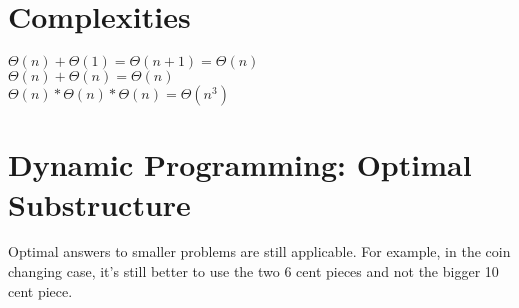 \documentclass{article}
\begin{document}
\section{Complexities}
\label{sec:orgf8be4fb}
\(\Theta(n) + \Theta(1) = \Theta(n+1) = \Theta(n)\) \\
\(\Theta(n) + \Theta(n) = \Theta(n)\) \\
\(\Theta(n) * \Theta(n) * \Theta(n) = \Theta(n^3)\) \\

\section{Dynamic Programming: Optimal Substructure}
\label{sec:orgf0eaf70}
Optimal answers to smaller problems are still applicable. For example, in the coin changing case, it's still better to use the two 6 cent pieces and not the bigger 10 cent piece.
\end{document}
